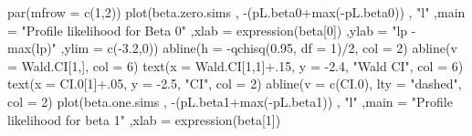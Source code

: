 \documentclass[
]{article}
\newenvironment{Shaded}{\begin{snugshade}}{\end{snugshade}}
\newcommand{\AttributeTok}[1]{\textcolor[rgb]{0.77,0.63,0.00}{#1}}
\newcommand{\DecValTok}[1]{\textcolor[rgb]{0.00,0.00,0.81}{#1}}
\newcommand{\FloatTok}[1]{\textcolor[rgb]{0.00,0.00,0.81}{#1}}
\newcommand{\FunctionTok}[1]{\textcolor[rgb]{0.00,0.00,0.00}{#1}}
\newcommand{\NormalTok}[1]{#1}
\newcommand{\SpecialCharTok}[1]{\textcolor[rgb]{0.00,0.00,0.00}{#1}}
\newcommand{\StringTok}[1]{\textcolor[rgb]{0.31,0.60,0.02}{#1}}
\begin{document}
\begin{Shaded}
\begin{Highlighting}[]
\FunctionTok{par}\NormalTok{(}\AttributeTok{mfrow =} \FunctionTok{c}\NormalTok{(}\DecValTok{1}\NormalTok{,}\DecValTok{2}\NormalTok{))}
\FunctionTok{plot}\NormalTok{(beta.zero.sims}
\NormalTok{     , }\SpecialCharTok{{-}}\NormalTok{(pL.beta0}\SpecialCharTok{+}\FunctionTok{max}\NormalTok{(}\SpecialCharTok{{-}}\NormalTok{pL.beta0))}
\NormalTok{     , }\StringTok{"l"}
\NormalTok{     ,}\AttributeTok{main =} \StringTok{"Profile likelihood for Beta 0"}
\NormalTok{     ,}\AttributeTok{xlab =} \FunctionTok{expression}\NormalTok{(beta[}\DecValTok{0}\NormalTok{])}
\NormalTok{     ,}\AttributeTok{ylab =} \StringTok{"lp {-} max(lp)"}
\NormalTok{     ,}\AttributeTok{ylim =} \FunctionTok{c}\NormalTok{(}\SpecialCharTok{{-}}\FloatTok{3.2}\NormalTok{,}\DecValTok{0}\NormalTok{))}
\FunctionTok{abline}\NormalTok{(}\AttributeTok{h =} \SpecialCharTok{{-}}\FunctionTok{qchisq}\NormalTok{(}\FloatTok{0.95}\NormalTok{, }\AttributeTok{df =} \DecValTok{1}\NormalTok{)}\SpecialCharTok{/}\DecValTok{2}\NormalTok{, }\AttributeTok{col =} \DecValTok{2}\NormalTok{)}
\FunctionTok{abline}\NormalTok{(}\AttributeTok{v =}\NormalTok{ Wald.CI[}\DecValTok{1}\NormalTok{,], }\AttributeTok{col =} \DecValTok{6}\NormalTok{)}
\FunctionTok{text}\NormalTok{(}\AttributeTok{x =}\NormalTok{ Wald.CI[}\DecValTok{1}\NormalTok{,}\DecValTok{1}\NormalTok{]}\SpecialCharTok{+}\NormalTok{.}\DecValTok{15}\NormalTok{, }\AttributeTok{y =} \SpecialCharTok{{-}}\FloatTok{2.4}\NormalTok{, }\StringTok{"Wald CI"}\NormalTok{, }\AttributeTok{col =} \DecValTok{6}\NormalTok{)}
\FunctionTok{text}\NormalTok{(}\AttributeTok{x =}\NormalTok{ CI}\FloatTok{.0}\NormalTok{[}\DecValTok{1}\NormalTok{]}\SpecialCharTok{+}\NormalTok{.}\DecValTok{05}\NormalTok{, }\AttributeTok{y =} \SpecialCharTok{{-}}\FloatTok{2.5}\NormalTok{, }\StringTok{"CI"}\NormalTok{, }\AttributeTok{col =} \DecValTok{2}\NormalTok{)}
\FunctionTok{abline}\NormalTok{(}\AttributeTok{v =} \FunctionTok{c}\NormalTok{(CI}\FloatTok{.0}\NormalTok{), }\AttributeTok{lty =} \StringTok{"dashed"}\NormalTok{, }\AttributeTok{col =} \DecValTok{2}\NormalTok{)}
\FunctionTok{plot}\NormalTok{(beta.one.sims}
\NormalTok{     , }\SpecialCharTok{{-}}\NormalTok{(pL.beta1}\SpecialCharTok{+}\FunctionTok{max}\NormalTok{(}\SpecialCharTok{{-}}\NormalTok{pL.beta1))}
\NormalTok{     , }\StringTok{"l"}
\NormalTok{     ,}\AttributeTok{main =} \StringTok{"Profile likelihood for beta 1"}
\NormalTok{     ,}\AttributeTok{xlab =} \FunctionTok{expression}\NormalTok{(beta[}\DecValTok{1}\NormalTok{])}

\end{Highlighting}
\end{Shaded}
\end{document}
